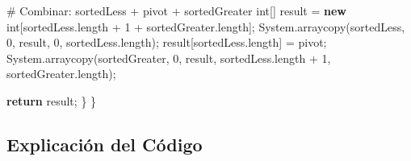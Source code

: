 \documentclass[
  spanish,
  letterpaper,
  DIV=11,
  numbers=noendperiod]{scrreprt}
\newenvironment{Shaded}{\begin{snugshade}}{\end{snugshade}}
\newcommand{\BuiltInTok}[1]{\textcolor[rgb]{0.00,0.23,0.31}{#1}}
\newcommand{\ControlFlowTok}[1]{\textcolor[rgb]{0.00,0.23,0.31}{\textbf{#1}}}
\newcommand{\DataTypeTok}[1]{\textcolor[rgb]{0.68,0.00,0.00}{#1}}
\newcommand{\DecValTok}[1]{\textcolor[rgb]{0.68,0.00,0.00}{#1}}
\newcommand{\FunctionTok}[1]{\textcolor[rgb]{0.28,0.35,0.67}{#1}}
\newcommand{\KeywordTok}[1]{\textcolor[rgb]{0.00,0.23,0.31}{\textbf{#1}}}
\newcommand{\NormalTok}[1]{\textcolor[rgb]{0.00,0.23,0.31}{#1}}
\newcommand{\OperatorTok}[1]{\textcolor[rgb]{0.37,0.37,0.37}{#1}}
\begin{document}
\begin{Shaded}
\begin{Highlighting}[]
\NormalTok{        \# Combinar}\OperatorTok{:}\NormalTok{ sortedLess }\OperatorTok{+}\NormalTok{ pivot }\OperatorTok{+}\NormalTok{ sortedGreater}
        \DataTypeTok{int}\OperatorTok{[]}\NormalTok{ result }\OperatorTok{=} \KeywordTok{new} \DataTypeTok{int}\OperatorTok{[}\NormalTok{sortedLess}\OperatorTok{.}\FunctionTok{length} \OperatorTok{+} \DecValTok{1} \OperatorTok{+}\NormalTok{ sortedGreater}\OperatorTok{.}\FunctionTok{length}\OperatorTok{];}
        \BuiltInTok{System}\OperatorTok{.}\FunctionTok{arraycopy}\OperatorTok{(}\NormalTok{sortedLess}\OperatorTok{,} \DecValTok{0}\OperatorTok{,}\NormalTok{ result}\OperatorTok{,} \DecValTok{0}\OperatorTok{,}\NormalTok{ sortedLess}\OperatorTok{.}\FunctionTok{length}\OperatorTok{);}
\NormalTok{        result}\OperatorTok{[}\NormalTok{sortedLess}\OperatorTok{.}\FunctionTok{length}\OperatorTok{]} \OperatorTok{=}\NormalTok{ pivot}\OperatorTok{;}
        \BuiltInTok{System}\OperatorTok{.}\FunctionTok{arraycopy}\OperatorTok{(}\NormalTok{sortedGreater}\OperatorTok{,} \DecValTok{0}\OperatorTok{,}\NormalTok{ result}\OperatorTok{,}\NormalTok{ sortedLess}\OperatorTok{.}\FunctionTok{length} \OperatorTok{+} \DecValTok{1}\OperatorTok{,} 
\NormalTok{        sortedGreater}\OperatorTok{.}\FunctionTok{length}\OperatorTok{);}
        
        \ControlFlowTok{return}\NormalTok{ result}\OperatorTok{;}
    \OperatorTok{\}}
\OperatorTok{\}}
\end{Highlighting}
\end{Shaded}

\subsection{Explicación del Código}\label{explicaciuxf3n-del-cuxf3digo}
\end{document}
